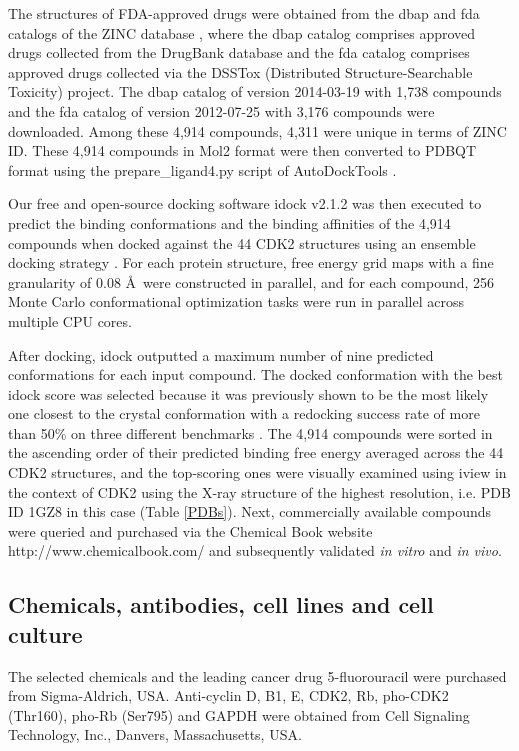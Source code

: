 \documentclass[10pt,letterpaper]{article}
\begin{document}
The structures of FDA-approved drugs were obtained from the dbap and fda catalogs of the ZINC database \cite{532,1178}, where the dbap catalog comprises approved drugs collected from the DrugBank database \cite{1594} and the fda catalog comprises approved drugs collected via the DSSTox (Distributed Structure-Searchable Toxicity) project. The dbap catalog of version 2014-03-19 with 1,738 compounds and the fda catalog of version 2012-07-25 with 3,176 compounds were downloaded. Among these 4,914 compounds, 4,311 were unique in terms of ZINC ID. These 4,914 compounds in Mol2 format were then converted to PDBQT format using the prepare\_ligand4.py script of AutoDockTools \cite{596}.

Our free and open-source docking software idock v2.1.2 \cite{1362} was then executed to predict the binding conformations and the binding affinities of the 4,914 compounds when docked against the 44 CDK2 structures using an ensemble docking strategy \cite{966,547,1128}. For each protein structure, free energy grid maps with a fine granularity of 0.08 \AA\ were constructed in parallel, and for each compound, 256 Monte Carlo conformational optimization tasks were run in parallel across multiple CPU cores.

After docking, idock outputted a maximum number of nine predicted conformations for each input compound. The docked conformation with the best idock score was selected because it was previously shown to be the most likely one closest to the crystal conformation with a redocking success rate of more than 50\% on three different benchmarks \cite{1362}. The 4,914 compounds were sorted in the ascending order of their predicted binding free energy averaged across the 44 CDK2 structures, and the top-scoring ones were visually examined using iview \cite{1366} in the context of CDK2 using the X-ray structure of the highest resolution, i.e. PDB ID 1GZ8 in this case (Table \ref{PDBs}). Next, commercially available compounds were queried and purchased via the Chemical Book website http://www.chemicalbook.com/ and subsequently validated \textit{in vitro} and \textit{in vivo}.

\subsection*{Chemicals, antibodies, cell lines and cell culture}

The selected chemicals and the leading cancer drug 5-fluorouracil were purchased from Sigma-Aldrich, USA. Anti-cyclin D, B1, E, CDK2, Rb, pho-CDK2 (Thr160), pho-Rb (Ser795) and GAPDH were obtained from Cell Signaling Technology, Inc., Danvers, Massachusetts, USA.
\end{document}
